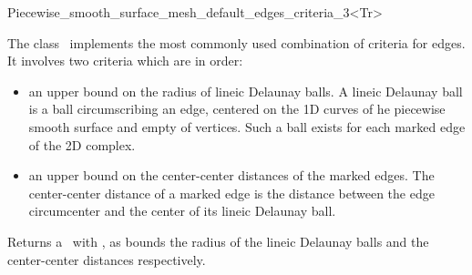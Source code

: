 
\begin{ccRefClass}{Piecewise_smooth_surface_mesh_default_edges_criteria_3<Tr>}

\ccDefinition
  
The class \ccRefName\  implements  the most commonly used combination
of criteria for edges. It involves two criteria which are
in order: 
\begin{itemize}
\item an upper bound on the radius of lineic Delaunay balls.
 A lineic Delaunay ball is a  ball circumscribing  an edge,
centered on the 1D curves of he piecewise smooth surface and empty of vertices.
 Such a ball exists for each marked edge of the 2D complex.
\item an upper bound on the center-center distances of the marked edges.
  The center-center distance of a marked edge
  is the distance between the edge circumcenter and the 
  center of its  lineic Delaunay ball. 
\end{itemize}


\ccIsModel


\ccTypes


\ccCreation
{}

{Returns a \ccRefName\ with ,
 as bounds the radius of the lineic Delaunay balls 
and the center-center distances respectively.}

\ccSeeAlso


\end{ccRefClass}

